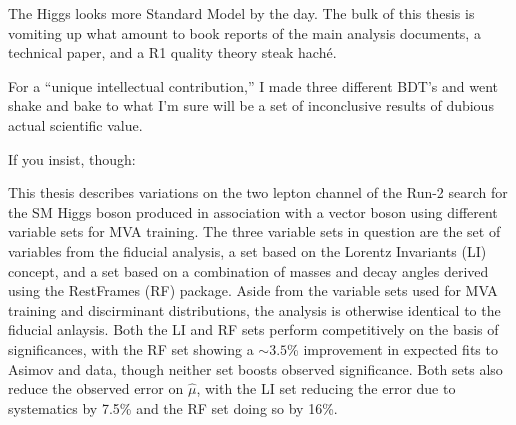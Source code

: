 
The Higgs looks more Standard Model by the day.  The bulk of this thesis is vomiting up what amount to book reports of the main analysis documents, a technical paper, and a R1 quality theory steak hach\'e.

For a ``unique intellectual contribution,'' I made three different BDT's and went shake and bake to what I'm sure will be a set of inconclusive results of dubious actual scientific value.

If you insist, though:

This thesis describes variations on the two lepton channel of the Run-2 search for the SM Higgs boson produced in association with a vector boson using different variable sets for MVA training.  
The three variable sets in question are the set of variables from the fiducial analysis, a set based on the Lorentz Invariants (LI) concept, and a set based on a combination of masses and decay angles derived using the RestFrames (RF) package.
Aside from the variable sets used for MVA training and discirminant distributions, the analysis is otherwise identical to the fiducial anlaysis. %
Both the LI and RF sets perform competitively on the basis of significances, with the RF set showing a $\sim3.5$\% improvement in expected fits to Asimov and data, though neither set boosts observed significance.
Both sets also reduce the observed error on $\hat{\mu}$, with the LI set reducing the error due to systematics by 7.5\% and the RF set doing so by 16\%.
